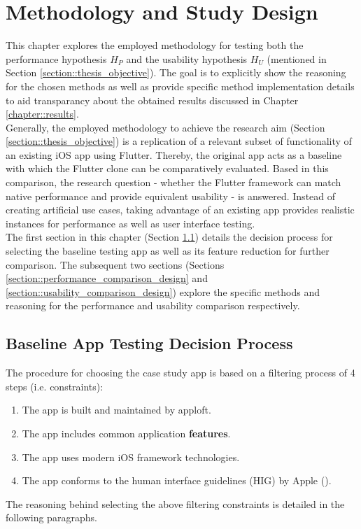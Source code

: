 \chapter{Methodology and Study Design}
This chapter explores the employed methodology for testing both the performance hypothesis $H_P$ and the usability hypothesis $H_U$ (mentioned in Section \ref{section::thesis_objective}). 
The goal is to explicitly show the reasoning for the chosen methods as well as provide specific method implementation details to aid transparancy about the obtained results discussed in Chapter \ref{chapter::results}.\\
Generally, the employed methodology to achieve the research aim (Section \ref{section::thesis_objective}) is a replication of a relevant subset of functionality of an existing iOS app using Flutter. Thereby, the original app acts as a baseline with which the Flutter clone 
can be comparatively evaluated. Based in this comparison, the research question - whether the Flutter framework can match native performance and provide equivalent usability - is answered.
Instead of creating artificial use cases, taking advantage of an existing app provides realistic instances for performance as well as user interface testing.\\
The first section in this chapter (Section \ref{section::feature_selection}) details the decision process for selecting the baseline testing app as well as its feature reduction for further comparison. 
The subsequent two sections (Sections \ref{section::performance_comparison_design} and \ref{section::usability_comparison_design}) explore the specific methods and reasoning for the performance and 
usability comparison respectively.




\section{Baseline App Testing Decision Process} \label{section::feature_selection}
The procedure for choosing the case study app is based on a filtering process of 4 steps (i.e. constraints):
\begin{enumerate}
    \item The app is built and maintained by apploft. \label{item::constraint_one}
    \item The app includes common application \textbf{features}. \label{item::constraint_two}
    \item The app uses modern iOS framework technologies. \label{item::constraint_three}
    \item The app conforms to the human interface guidelines (HIG) by Apple (\cite{Apple2021a}). \label{item::constraint_four}
\end{enumerate}
The reasoning behind selecting the above filtering constraints is detailed in the following paragraphs.

